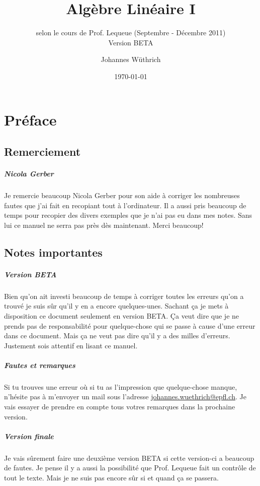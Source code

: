 \documentclass[10pt,a4paper]{scrreprt}
\title{Algèbre Linéaire I}
\subtitle{selon le cours de Prof. Lequeue (Septembre - Décembre 2011) \\ Version BETA}
\author{Johannes Wüthrich}
\date{\today}
\begin{document}
\maketitle

\setcounter{chapter}{-1}

\chapter{Préface}
%
\section{Remerciement}
%
\paragraph{Nicola Gerber} Je remercie beaucoup Nicola Gerber pour son aide à corriger les nombreuses fautes que j'ai fait en recopiant tout à l'ordinateur. Il a aussi pris beaucoup de temps pour recopier des divers exemples que je n'ai pas eu dans mes notes. Sans lui ce manuel ne serra pas près dès maintenant. Merci beaucoup!

%
\section{Notes importantes}
%
\paragraph{Version BETA} Bien qu'on ait investi beaucoup de temps à corriger toutes les erreurs qu'on a trouvé je suis sûr qu'il y en a encore quelques-unes. Sachant ça je mets à disposition ce document seulement en version BETA. Ça veut dire que je ne prends pas de responsabilité pour quelque-chose qui se passe à cause d'une erreur dans ce document. Mais ça ne veut pas dire qu'il y a des milles d'erreurs. Justement sois attentif en lisant ce manuel.

\paragraph{Fautes et remarques} Si tu trouves une erreur où si tu as l'impression que quelque-chose manque, n'hésite pas à m'envoyer un mail sous l'adresse \href{mailto:johannes.wuethrich@epfl.ch}{johannes.wuethrich@epfl.ch}. Je vais essayer de prendre en compte tous votres remarques dans la prochaine version.

\paragraph{Version finale} Je vais sûrement faire une deuxième version BETA si cette version-ci a beaucoup de fautes. Je pense il y a aussi la possibilité que Prof. Lequeue fait un contrôle de tout le texte. Mais je ne suis pas encore sûr si et quand ça se passera. 

\tableofcontents













\end{document}
